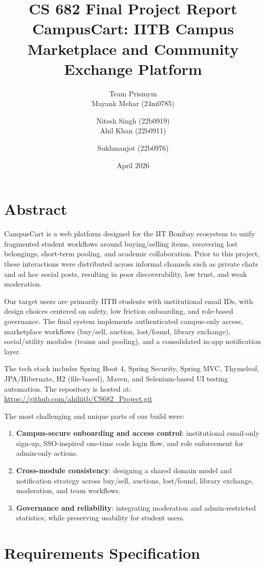 \documentclass[12pt,a4paper]{article}
\title{\textbf{CS 682 Final Project Report}\\[4pt]
CampusCart: IITB Campus Marketplace and Community Exchange Platform}
\author{Team Prismym\\
Mayank Mehar (24m0785) \and Nitesh Singh (22b0919) \\
Ahil Khan (22b0911) \and Sukhmanjot (22b0976)}
\date{April 2026}
\begin{document}
\maketitle
\tableofcontents
\newpage

\section{Abstract}
CampusCart is a web platform designed for the IIT Bombay ecosystem to unify fragmented student workflows around buying/selling items, recovering lost belongings, short-term pooling, and academic collaboration. Prior to this project, these interactions were distributed across informal channels such as private chats and ad hoc social posts, resulting in poor discoverability, low trust, and weak moderation.

Our target users are primarily IITB students with institutional email IDs, with design choices centered on safety, low friction onboarding, and role-based governance. The final system implements authenticated campus-only access, marketplace workflows (buy/sell, auction, lost/found, library exchange), social/utility modules (teams and pooling), and a consolidated in-app notification layer.

The tech stack includes Spring Boot 4, Spring Security, Spring MVC, Thymeleaf, JPA/Hibernate, H2 (file-based), Maven, and Selenium-based UI testing automation. The repository is hosted at:\\
\url{https://github.com/ahiliitb/CS682_Project.git}

The most challenging and unique parts of our build were:
\begin{enumerate}[leftmargin=*]
    \item \textbf{Campus-secure onboarding and access control}: institutional email-only sign-up, SSO-inspired one-time code login flow, and role enforcement for admin-only actions.
    \item \textbf{Cross-module consistency}: designing a shared domain model and notification strategy across buy/sell, auctions, lost/found, library exchange, moderation, and team workflows.
    \item \textbf{Governance and reliability}: integrating moderation and admin-restricted statistics, while preserving usability for student users.
\end{enumerate}

\newpage
\section{Requirements Specification}
\end{document}
